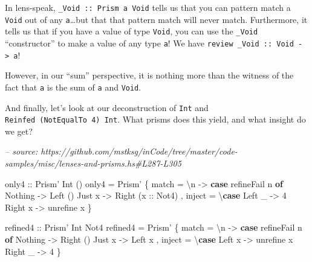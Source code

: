 \documentclass[]{article}
\newenvironment{Shaded}{}{}
\newcommand{\CommentTok}[1]{\textcolor[rgb]{0.38,0.63,0.69}{\textit{#1}}}
\newcommand{\DataTypeTok}[1]{\textcolor[rgb]{0.56,0.13,0.00}{#1}}
\newcommand{\DecValTok}[1]{\textcolor[rgb]{0.25,0.63,0.44}{#1}}
\newcommand{\FunctionTok}[1]{\textcolor[rgb]{0.02,0.16,0.49}{#1}}
\newcommand{\KeywordTok}[1]{\textcolor[rgb]{0.00,0.44,0.13}{\textbf{#1}}}
\newcommand{\NormalTok}[1]{#1}
\newcommand{\OtherTok}[1]{\textcolor[rgb]{0.00,0.44,0.13}{#1}}
\begin{document}
In lens-speak, \texttt{\_Void\ ::\ Prism\textquotesingle{}\ a\ Void} tells us
that you can pattern match a \texttt{Void} out of any \texttt{a}\ldots{}but that
that pattern match will never match. Furthermore, it tells us that if you have a
value of type \texttt{Void}, you can use the \texttt{\_Void} ``constructor'' to
make a value of any type \texttt{a}! We have
\texttt{review\ \_Void\ ::\ Void\ -\textgreater{}\ a}!

However, in our ``sum'' perspective, it is nothing more than the witness of the
fact that \texttt{a} is the sum of \texttt{a} and \texttt{Void}.

And finally, let's look at our deconstruction of \texttt{Int} and
\texttt{Reinfed\ (NotEqualTo\ 4)\ Int}. What prisms does this yield, and what
insight do we get?

\begin{Shaded}
\begin{Highlighting}[]
\CommentTok{-- source: https://github.com/mstksg/inCode/tree/master/code-samples/misc/lenses-and-prisms.hs#L287-L305}

\OtherTok{only4 ::} \DataTypeTok{Prism'} \DataTypeTok{Int}\NormalTok{ ()}
\NormalTok{only4 }\FunctionTok{=} \DataTypeTok{Prism'}
\NormalTok{    \{ match  }\FunctionTok{=}\NormalTok{ \textbackslash{}n }\OtherTok{->} \KeywordTok{case}\NormalTok{ refineFail n }\KeywordTok{of}
        \DataTypeTok{Nothing} \OtherTok{->} \DataTypeTok{Left}\NormalTok{ ()}
        \DataTypeTok{Just}\NormalTok{ x  }\OtherTok{->} \DataTypeTok{Right}\NormalTok{ (}\OtherTok{x ::} \DataTypeTok{Not4}\NormalTok{)}
\NormalTok{    , inject }\FunctionTok{=}\NormalTok{ \textbackslash{}}\KeywordTok{case}
        \DataTypeTok{Left}\NormalTok{  _ }\OtherTok{->} \DecValTok{4}
        \DataTypeTok{Right}\NormalTok{ x }\OtherTok{->}\NormalTok{ unrefine x}
\NormalTok{    \}}

\OtherTok{refined4 ::} \DataTypeTok{Prism'} \DataTypeTok{Int} \DataTypeTok{Not4}
\NormalTok{refined4 }\FunctionTok{=} \DataTypeTok{Prism'}
\NormalTok{    \{ match  }\FunctionTok{=}\NormalTok{ \textbackslash{}n }\OtherTok{->} \KeywordTok{case}\NormalTok{ refineFail n }\KeywordTok{of}
        \DataTypeTok{Nothing} \OtherTok{->} \DataTypeTok{Right}\NormalTok{ ()}
        \DataTypeTok{Just}\NormalTok{ x  }\OtherTok{->} \DataTypeTok{Left}\NormalTok{ x}
\NormalTok{    , inject }\FunctionTok{=}\NormalTok{ \textbackslash{}}\KeywordTok{case}
        \DataTypeTok{Left}\NormalTok{  x }\OtherTok{->}\NormalTok{ unrefine x}
        \DataTypeTok{Right}\NormalTok{ _ }\OtherTok{->} \DecValTok{4}
\NormalTok{    \}}
\end{Highlighting}
\end{Shaded}
\end{document}
